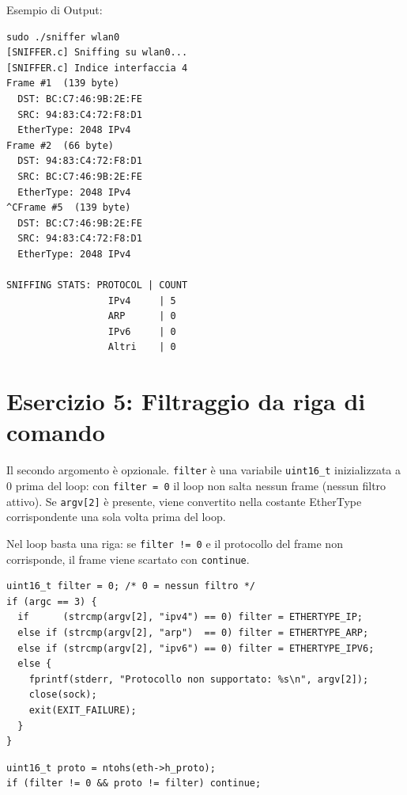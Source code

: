 \documentclass[a4paper,12pt]{article}
\begin{document}
Esempio di Output:
\begin{lstlisting}[language={}, caption={Output -- Ctrl+C dopo 5 frame}]
sudo ./sniffer wlan0
[SNIFFER.c] Sniffing su wlan0...
[SNIFFER.c] Indice interfaccia 4
Frame #1  (139 byte)
  DST: BC:C7:46:9B:2E:FE
  SRC: 94:83:C4:72:F8:D1
  EtherType: 2048 IPv4
Frame #2  (66 byte)
  DST: 94:83:C4:72:F8:D1
  SRC: BC:C7:46:9B:2E:FE
  EtherType: 2048 IPv4
^CFrame #5  (139 byte)
  DST: BC:C7:46:9B:2E:FE
  SRC: 94:83:C4:72:F8:D1
  EtherType: 2048 IPv4

SNIFFING STATS: PROTOCOL | COUNT
                  IPv4     | 5
                  ARP      | 0
                  IPv6     | 0
                  Altri    | 0
\end{lstlisting}

\section{Esercizio 5: Filtraggio da riga di comando}

Il secondo argomento è opzionale. \texttt{filter} è una variabile \texttt{uint16\_t}
inizializzata a 0 prima del loop: con \texttt{filter = 0} il loop non salta nessun frame
(nessun filtro attivo). Se \texttt{argv[2]} è presente, viene convertito nella costante
EtherType corrispondente una sola volta prima del loop.

Nel loop basta una riga: se \texttt{filter != 0} e il protocollo del frame non corrisponde,
il frame viene scartato con \texttt{continue}.

\begin{lstlisting}[caption={Parsing del filtro da argv[2] -- prima del loop}]
uint16_t filter = 0; /* 0 = nessun filtro */
if (argc == 3) {
  if      (strcmp(argv[2], "ipv4") == 0) filter = ETHERTYPE_IP;
  else if (strcmp(argv[2], "arp")  == 0) filter = ETHERTYPE_ARP;
  else if (strcmp(argv[2], "ipv6") == 0) filter = ETHERTYPE_IPV6;
  else {
    fprintf(stderr, "Protocollo non supportato: %s\n", argv[2]);
    close(sock);
    exit(EXIT_FAILURE);
  }
}
\end{lstlisting}

\begin{lstlisting}[caption={Applicazione filtro nel loop}]
uint16_t proto = ntohs(eth->h_proto);
if (filter != 0 && proto != filter) continue;
\end{lstlisting}
\end{document}
